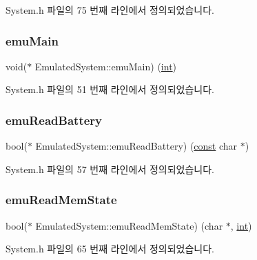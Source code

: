 System.\+h 파일의 75 번째 라인에서 정의되었습니다.

\mbox{\label{struct_emulated_system_a7ff4d7f593baf3463709ea72a6c4a20b}} 
\subsubsection{\texorpdfstring{emu\+Main}{emuMain}}
{\footnotesize\ttfamily void($\ast$ Emulated\+System\+::emu\+Main) (\mbox{\hyperlink{_util_8cpp_a0ef32aa8672df19503a49fab2d0c8071}{int}})}



System.\+h 파일의 51 번째 라인에서 정의되었습니다.

\mbox{\label{struct_emulated_system_a8cf069af2706aff38ac0ec1f5ae91a69}} 
\subsubsection{\texorpdfstring{emu\+Read\+Battery}{emuReadBattery}}
{\footnotesize\ttfamily bool($\ast$ Emulated\+System\+::emu\+Read\+Battery) (\mbox{\hyperlink{getopt1_8c_a2c212835823e3c54a8ab6d95c652660e}{const}} char $\ast$)}



System.\+h 파일의 57 번째 라인에서 정의되었습니다.

\mbox{\label{struct_emulated_system_aeb808d20d5ba0fe3ffa5ec59c798105f}} 
\subsubsection{\texorpdfstring{emu\+Read\+Mem\+State}{emuReadMemState}}
{\footnotesize\ttfamily bool($\ast$ Emulated\+System\+::emu\+Read\+Mem\+State) (char $\ast$, \mbox{\hyperlink{_util_8cpp_a0ef32aa8672df19503a49fab2d0c8071}{int}})}



System.\+h 파일의 65 번째 라인에서 정의되었습니다.

